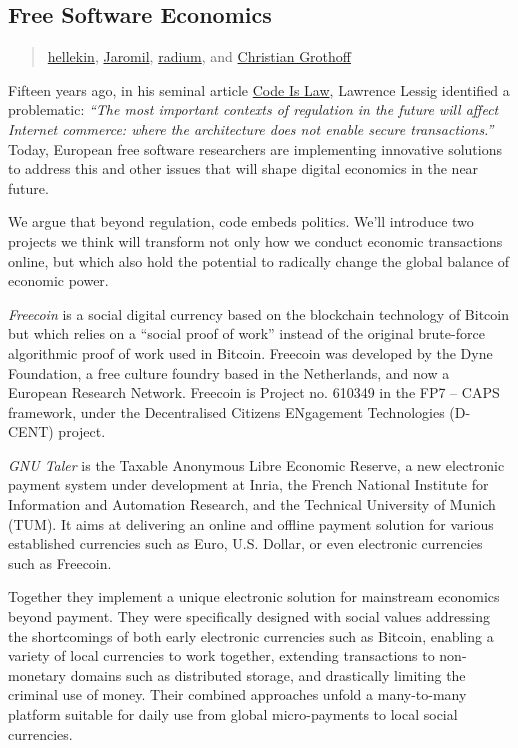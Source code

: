\subsection{Free Software Economics}\label{free-software-economics}

\begin{quote}
\href{../appendix/attributions.html\#hellekin}{hellekin},
\href{../appendix/attributions.html\#jaromil}{Jaromil},
\href{../appendix/attributions.html\#radium}{radium}, and
\href{../appendix/attributions.html\#christian-grothoff}{Christian
Grothoff}
\end{quote}

Fifteen years ago, in his seminal article
\href{http://harvardmagazine.com/2000/01/code-is-law-html}{Code Is Law},
Lawrence Lessig identified a problematic: \emph{``The most important
contexts of regulation in the future will affect Internet commerce:
where the architecture does not enable secure transactions.''} Today,
European free software researchers are implementing innovative solutions
to address this and other issues that will shape digital economics in
the near future.

We argue that beyond regulation, code embeds politics. We'll introduce
two projects we think will transform not only how we conduct economic
transactions online, but which also hold the potential to radically
change the global balance of economic power.

\emph{Freecoin} is a social digital currency based on the blockchain
technology of Bitcoin but which relies on a ``social proof of work''
instead of the original brute-force algorithmic proof of work used in
Bitcoin. Freecoin was developed by the Dyne Foundation, a free culture
foundry based in the Netherlands, and now a European Research Network.
Freecoin is Project no. 610349 in the FP7 -- CAPS framework, under the
Decentralised Citizens ENgagement Technologies (D-CENT) project.

\emph{GNU Taler} is the Taxable Anonymous Libre Economic Reserve, a new
electronic payment system under development at Inria, the French
National Institute for Information and Automation Research, and the
Technical University of Munich (TUM). It aims at delivering an online
and offline payment solution for various established currencies such as
Euro, U.S. Dollar, or even electronic currencies such as Freecoin.

Together they implement a unique electronic solution for mainstream
economics beyond payment. They were specifically designed with social
values addressing the shortcomings of both early electronic currencies
such as Bitcoin, enabling a variety of local currencies to work
together, extending transactions to non-monetary domains such as
distributed storage, and drastically limiting the criminal use of money.
Their combined approaches unfold a many-to-many platform suitable for
daily use from global micro-payments to local social currencies.


